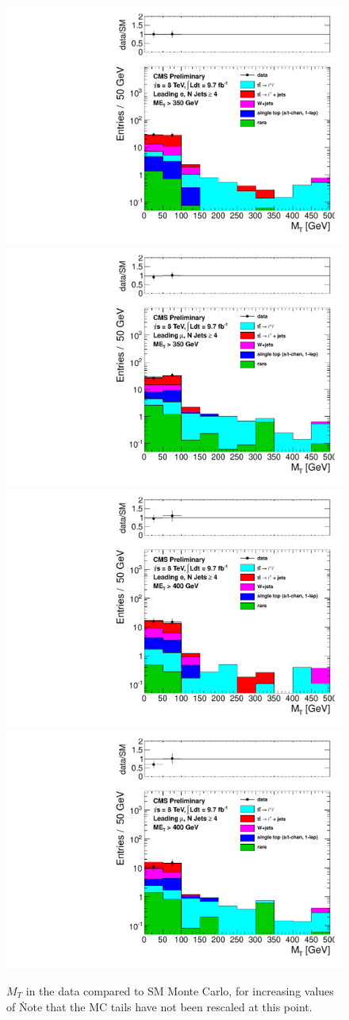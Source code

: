 \begin{figure}[hbt]
  \begin{center}
        \includegraphics[width=0.5\linewidth]{plots/mt_met350_ele.pdf}%
        \includegraphics[width=0.5\linewidth]{plots/mt_met350_muo.pdf}
        \includegraphics[width=0.5\linewidth]{plots/mt_met400_ele.pdf}%
        \includegraphics[width=0.5\linewidth]{plots/mt_met400_muo.pdf}

    \caption{$M_T$ in the data compared to SM Monte Carlo, for
      increasing values of \met\.  Note that the MC tails have not
      been rescaled at this point.
\label{fig:mtsig3}
}  
      \end{center}
\end{figure}

\clearpage